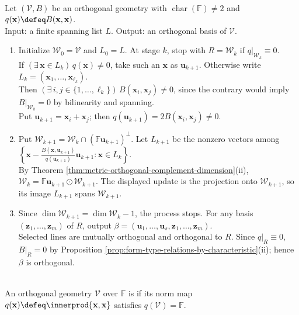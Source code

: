 \begin{computationmethod} \label{meth:lagrange-orthogonalization-arbitrary-field} \\
Let $(\mathcal{V},B)$ be an orthogonal geometry with $\operatorname{char}(\mathbb{F})\neq2$ and $q(\mathbf{x})\defeq B(\mathbf{x},\mathbf{x})$.\\
Input: a finite spanning list $L$. Output: an orthogonal basis of $\mathcal{V}$.
\begin{enumerate}[label=(\roman*)]
\setlength{\itemsep}{0pt}
\item Initialize $\mathcal{W}_0=\mathcal{V}$ and $L_0=L$. At stage $k$, stop with $R=\mathcal{W}_k$ if $q|_{\mathcal{W}_k}\equiv0$.\\
If $(\exists\,\mathbf{x}\in L_k)\,q(\mathbf{x})\neq0$, take such an $\mathbf{x}$ as $\mathbf{u}_{k+1}$. Otherwise write $L_k=(\mathbf{x}_1,\ldots,\mathbf{x}_{\ell_k})$.\\
Then $(\exists\,i,j\in\{1,\ldots,\ell_k\})\,B(\mathbf{x}_i,\mathbf{x}_j)\neq0$, since the contrary would imply $B|_{\mathcal{W}_k}=0$ by bilinearity and spanning.\\
Put $\mathbf{u}_{k+1}=\mathbf{x}_i+\mathbf{x}_j$; then $q(\mathbf{u}_{k+1})=2B(\mathbf{x}_i,\mathbf{x}_j)\neq0$.
\item Put $\mathcal{W}_{k+1}=\mathcal{W}_k\cap(\mathbb{F}\mathbf{u}_{k+1})^{\perp}$. Let $L_{k+1}$ be the nonzero vectors among $\left\{\mathbf{x}-\frac{B(\mathbf{x},\mathbf{u}_{k+1})}{q(\mathbf{u}_{k+1})}\mathbf{u}_{k+1}:\mathbf{x}\in L_k\right\}$.\\
By Theorem \ref{thm:metric-orthogonal-complement-dimension}(ii), $\mathcal{W}_k=\mathbb{F}\mathbf{u}_{k+1}\odot\mathcal{W}_{k+1}$. The displayed update is the projection onto $\mathcal{W}_{k+1}$, so its image $L_{k+1}$ spans $\mathcal{W}_{k+1}$.
\item Since $\dim\mathcal{W}_{k+1}=\dim\mathcal{W}_k-1$, the process stops. For any basis $(\mathbf{z}_1,\ldots,\mathbf{z}_m)$ of $R$, output $\beta=(\mathbf{u}_1,\ldots,\mathbf{u}_s,\mathbf{z}_1,\ldots,\mathbf{z}_m)$.\\
Selected lines are mutually orthogonal and orthogonal to $R$. Since $q|_R\equiv0$, $B|_R=0$ by Proposition \ref{prop:form-type-relations-by-characteristic}(ii); hence $\beta$ is orthogonal.
\end{enumerate}
\end{computationmethod}

\begin{definition} \label{def:universal-orthogonal-geometry} \\
An orthogonal geometry $\mathcal{V}$ over $\mathbb{F}$ is  if its norm map $q(\mathbf{x})\defeq\innerprod{\mathbf{x},\mathbf{x}}$ satisfies $q(\mathcal{V})=\mathbb{F}$.
\end{definition}

